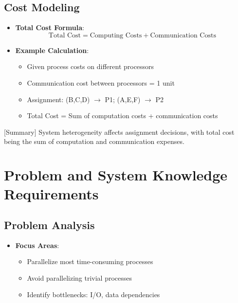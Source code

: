 \documentclass[12pt]{article}
\begin{document}
\subsection{Cost Modeling}
\begin{itemize}
  \item \textbf{Total Cost Formula}:
        \[
          \text{Total Cost} = \text{Computing Costs} + \text{Communication Costs}
        \]

  \item \textbf{Example Calculation}:
        \begin{itemize}
          \item Given process costs on different processors
          \item Communication cost between processors = 1 unit
          \item Assignment: (B,C,D) $\rightarrow$ P1; (A,E,F) $\rightarrow$ P2
          \item Total Cost = Sum of computation costs + communication costs
        \end{itemize}
\end{itemize}

[Summary] System heterogeneity affects assignment decisions, with total cost being the sum of computation and communication expenses.

\section{Problem and System Knowledge Requirements}

\subsection{Problem Analysis}
\begin{itemize}
  \item \textbf{Focus Areas}:
        \begin{itemize}
          \item Parallelize most time-consuming processes
          \item Avoid parallelizing trivial processes
          \item Identify bottlenecks: I/O, data dependencies
        \end{itemize}
\end{itemize}
\end{document}
